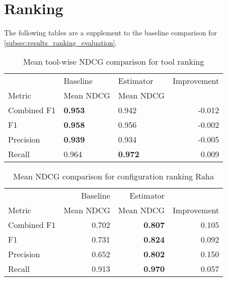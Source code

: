 \chapter{Ranking} %
\label{app:ranking}
The following tables are a supplement to the baseline comparison for \autoref{subsec:results_ranking_evaluation}.

\begin{table}[H]
\centering
\caption{Mean tool-wise NDCG comparison for tool ranking}
\begin{tabular}{lllr}
\toprule
{} &  Baseline &  Estimator &  Improvement \\
Metric          & Mean NDCG  &  Mean NDCG  &              \\
\midrule
Combined F1 &  \textbf{0.953} &           0.942 &       -0.012 \\
F1          &  \textbf{0.958} &           0.956 &       -0.002 \\
Precision   &  \textbf{0.939} &           0.934 &       -0.005 \\
Recall      &           0.964 &  \textbf{0.972} &        0.009 \\
\bottomrule
\end{tabular}
\end{table}

\begin{table}[H]
\centering
\caption{Mean NDCG comparison for configuration ranking Raha}
\begin{tabular}{lrrr}
\toprule
{} &  Baseline &  Estimator &   \\
Metric          & Mean NDCG  &  Mean NDCG  &       Improvement       \\
\midrule
Combined F1 &               0.702 &                \textbf{0.807} &        0.105 \\
F1       &               0.731 &                \textbf{0.824} &        0.092 \\
Precision     &               0.652 &                \textbf{0.802} &        0.150 \\
Recall      &               0.913 &                \textbf{0.970} &        0.057 \\
\bottomrule
\end{tabular}
\end{table}

